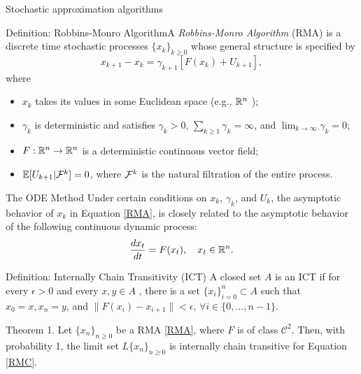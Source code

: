  
\begin{frame}[c]{Stochastic approximation algorithms}
\begin{block}{Definition: Robbins-Monro Algorithm}A {\it Robbins-Monro
    Algorithm} (RMA) is a discrete time stochastic processes
  $\{x_k\}_{k \geq 0}$ whose general structure is specified by
\begin{equation}
\label{RMA}
x_{k+1}-x_k=\gamma_{k+1}[F(x_k)+U_{k+1}],
\end{equation}
\noindent	
where
\begin{itemize}
\item $x_k$ takes its values in some Euclidean space (e.g., $\mathbb{R}^n$ );
\item $\gamma_k$ is deterministic and satisfies $\gamma_k>0$,
  $\sum_{k \geq 1}\gamma_k=\infty$, and $\lim_{k \to\infty}\gamma_k=0$;
\item $F:\mathbb{R}^n\to\mathbb{R}^n$ is a deterministic continuous vector field;
\item $\mathbb{E}[U_{k+1}| \mathcal{F}^k]=0$, where $\mathcal{F}^k$ is the natural filtration of
  the entire process.%
\end{itemize}
\end{block}
	
\end{frame}	
	
	
	



\begin{frame}[c]{The ODE Method}
Under certain conditions on $x_k$, $\gamma_k$, and $U_{k}$, the asymptotic
behavior of $x_k$ in Equation \eqref{RMA}, is closely related to the asymptotic behavior of the following continuous dynamic
process:
\begin{equation}
\label{RMC}
\frac{dx_t}{dt}=F(x_t), \quad x_t\in\mathbb{R}^n. 
\end{equation}

\begin{block}{Definition: Internally Chain Transitivity (ICT)}
A closed set $A$ is an ICT if for every $\epsilon>0$  and every $x,y\in A$ , there is a set $\{x_i\}_{i=0}^n\subset A$ such that $x_0=x, x_n=y$, and  $\|F(x_i)-x_{i+1}\|<\epsilon$, $\forall i\in\{0,...,n-1\}$.
\end{block}

\begin{exampleblock}{Theorem 1.}
Let $\{x_n\}_{n \geq 0}$ be a RMA \eqref{RMA}, where $F$ is of class $\mathcal{C}^2.$ %
Then,  with probability 1, the limit set $L\{x_n\}_{n \geq 0}$ is
  internally chain transitive for Equation \eqref{RMC}.
\end{exampleblock}

\end{frame}


